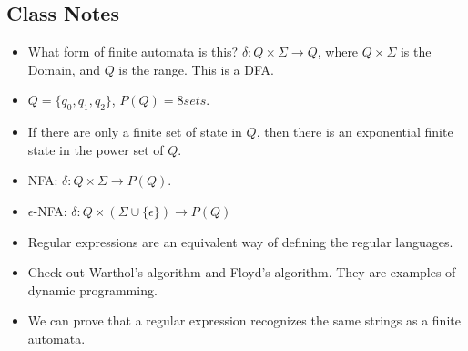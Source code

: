 \documentclass[]{article}
\begin{document}
  \subsection*{Class Notes}
    \begin{itemize}
      \item What form of finite automata is this? $\delta: Q \times \Sigma 
      \rightarrow Q$, where $Q \times \Sigma$ is the Domain, and $Q$ is the 
      range. This is a DFA.
      \item $Q = \{q_0, q_1, q_2\}$, $P(Q) = 8 sets$.
      \item If there are only a finite set of state in $Q$, then there is an 
      exponential finite state in the power set of $Q$.
      \item NFA: $\delta: Q\times\Sigma \rightarrow P(Q)$.
      \item $\epsilon$-NFA: $\delta: Q\times(\Sigma\cup\{\epsilon\}) \rightarrow 
      P(Q)$
      \item Regular expressions are an equivalent way of defining the regular 
      languages.
      \item Check out Warthol's algorithm and Floyd's algorithm. They are 
      examples of dynamic programming.
      \item We can prove that a regular expression recognizes the same strings 
      as a finite automata.
    \end{itemize}
\end{document}
